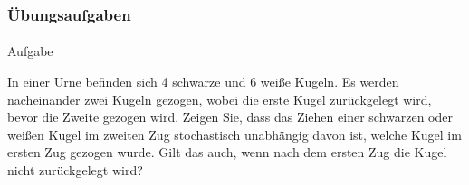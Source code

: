 \documentclass{beamer}
\begin{document}
\begin{frame}
    \frametitle{Übungsaufgaben}
\framesubtitle{}
\begin{block}{Aufgabe}

In einer Urne befinden sich 4 schwarze und 6 weiße Kugeln.
Es werden nacheinander zwei Kugeln gezogen, wobei die erste Kugel zurückgelegt wird, bevor die Zweite gezogen wird.
Zeigen Sie, dass das Ziehen einer schwarzen oder weißen Kugel im zweiten Zug stochastisch unabhängig davon ist, welche Kugel im ersten Zug gezogen wurde.
Gilt das auch, wenn nach dem ersten Zug die Kugel nicht zurückgelegt wird?


\end{block}
 \end{frame}
\end{document}
